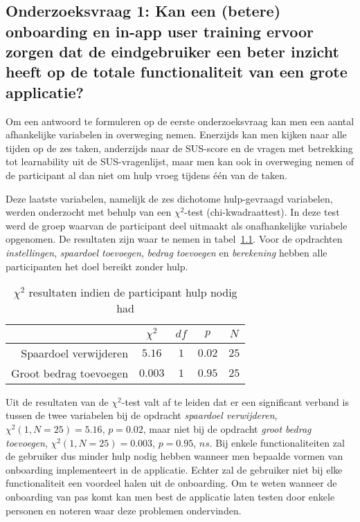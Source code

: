 \chapter{}
\label{ch:resultaten}

\section[Onderzoeksvraag 1]{Onderzoeksvraag 1: Kan een (betere) onboarding en in-app user training ervoor zorgen dat de eindgebruiker een beter inzicht heeft op de totale functionaliteit van een grote applicatie?}
\label{sec:onderzoeksvraag-1}

Om een antwoord te formuleren op de eerste onderzoeksvraag kan men een aantal afhankelijke variabelen in overweging nemen. Enerzijds kan men kijken naar alle tijden op de zes taken, anderzijds naar de SUS-score en de vragen met betrekking tot learnability uit de SUS-vragenlijst, maar men kan ook in overweging nemen of de participant al dan niet om hulp vroeg tijdens één van de taken.

Deze laatste variabelen, namelijk de zes dichotome hulp-gevraagd variabelen, werden onderzocht met behulp van een $\chi^2$-test (chi-kwadraattest). In deze test werd de groep waarvan de participant deel uitmaakt als onafhankelijke variabele opgenomen. De resultaten zijn waar te nemen in tabel~\ref{tab:chisq-hulp}. Voor de opdrachten \textit{instellingen}, \textit{spaardoel toevoegen}, \textit{bedrag toevoegen} en \textit{berekening} hebben alle participanten het doel bereikt zonder hulp.

\begin{table}[]
    \centering
    \begin{tabular}{r|cccc}
        & $\chi^2$ & $df$ & $p$ & $N$ \\ \hline
        Spaardoel verwijderen & $5.16$ & $1$ & $0.02$ & $25$ \\
        Groot bedrag toevoegen & $0.003$ & $1$ & $0.95$ & $25$
    \end{tabular}
    \caption{$\chi^2$ resultaten indien de participant hulp nodig had}
    \label{tab:chisq-hulp}
\end{table}

Uit de resultaten van de $\chi^2$-test valt af te leiden dat er een significant verband is tussen de twee variabelen bij de opdracht \textit{spaardoel verwijderen}, $\chi^2 (1, N = 25) = 5.16$, $p = 0.02$, maar niet bij de opdracht \textit{groot bedrag toevoegen}, $\chi^2 (1, N = 25) = 0.003$, $p = 0.95$, $ns$. Bij enkele functionaliteiten zal de gebruiker dus minder hulp nodig hebben wanneer men bepaalde vormen van onboarding implementeert in de applicatie. Echter zal de gebruiker niet bij elke functionaliteit een voordeel halen uit de onboarding. Om te weten wanneer de onboarding van pas komt kan men best de applicatie laten testen door enkele personen en noteren waar deze problemen ondervinden.

